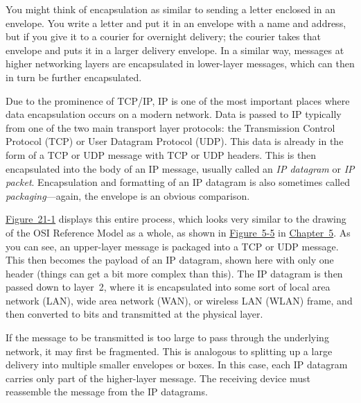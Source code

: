 You might think of encapsulation as similar to sending a letter enclosed
in an
\protect\hypertarget{ch21.htmlux5cux23idx-CHP-21-0775}{}{}envelope. You
write a letter and put it in an envelope with a name and address, but if
you give it to a courier for overnight delivery; the courier takes that
envelope and puts it in a larger delivery envelope. In a similar way,
messages at higher networking layers are encapsulated in lower-layer
messages, which can then in turn be further encapsulated.

Due to the prominence of TCP/IP, IP is one of the most important places
where data encapsulation occurs on a modern network. Data is passed to
IP typically from one of the two main transport layer protocols: the
Transmission Control Protocol (TCP) or User Datagram Protocol (UDP).
This data is already in the form of a TCP or UDP message with TCP or UDP
headers. This is then encapsulated into the body of an IP message,
usually called an {\emph{IP datagram}} or {\emph{IP packet}}.
Encapsulation and formatting of an IP datagram is also sometimes called
{\emph{packaging}}---again, the envelope is an obvious comparison.

\protect\hyperlink{ch21.htmlux5cux23ip_datagram_encapsulation_the_upper-laye}{Figure~21-1}
displays this entire process, which looks very similar to the drawing of
the OSI Reference Model as a whole, as shown in
\protect\hyperlink{ch05s03.htmlux5cux23osi_reference_model_data_encapsulation_e}{Figure~5-5}
in \protect\hyperlink{ch05.html}{Chapter~5}. As you can see, an
upper-layer message is packaged into a TCP or UDP message. This then
becomes the payload of an IP datagram, shown here with only one header
(things can get a bit more complex than this). The IP datagram is then
passed down to layer~2, where it is encapsulated into some sort of local
area network (LAN), wide area network (WAN), or wireless LAN (WLAN)
frame, and then converted to bits and transmitted at the physical layer.

If the message to be transmitted is too large to pass through the
underlying network, it may first be fragmented. This is analogous to
splitting up a large delivery into multiple smaller envelopes or boxes.
In this case, each IP datagram carries only part of the higher-layer
message. The receiving device must reassemble the message from the IP
datagrams.

\protect\hypertarget{ch21.htmlux5cux23ip_datagram_encapsulation_the_upper-laye}{}{}

\protect\hypertarget{ch21.htmlux5cux23I_mediaobject7_d1e22746}{}{}


